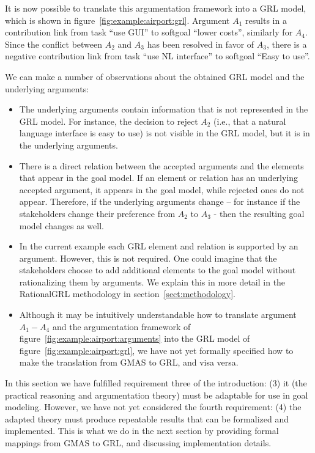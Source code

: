 \documentclass[11.5pt,two column]{llncs}
\begin{document}
It is now possible to translate this argumentation framework into a GRL model, which is shown in figure~\ref{fig:example:airport:grl}. Argument $A_1$ results in a contribution link from task ``use GUI'' to softgoal ``lower costs'', similarly for $A_4$. Since the conflict between $A_2$ and $A_3$ has been resolved in favor of $A_3$, there is a negative contribution link from task ``use NL interface'' to softgoal ``Easy to use''.

We can make a number of observations about the obtained GRL model and the underlying arguments:
\begin{itemize}
\item The underlying arguments contain information that is not represented in the GRL model. For instance, the decision to reject $A_2$ (i.e., that a natural language interface is easy to use) is not visible in the GRL model, but it is in the underlying arguments.
\item There is a direct relation between the accepted arguments and the elements that appear in the goal model. If an element or relation has an underlying accepted argument, it appears in the goal model, while rejected ones do not appear. Therefore, if the underlying arguments change \--- for instance if the stakeholders change their preference from $A_2$ to $A_3$ \-- then the resulting goal model changes as well.
\item In the current example each GRL element and relation is supported by an argument. However, this is not required. One could imagine that the stakeholders choose to add additional elements to the goal model without rationalizing them by arguments. We explain this in more detail in the RationalGRL methodology in section~\ref{sect:methodology}. 
\item Although it may be intuitively understandable how to translate argument $A_1-A_4$ and the argumentation framework of figure~\ref{fig:example:airport:arguments} into the GRL model of figure~\ref{fig:example:airport:grl}, we have not yet formally specified how to make the translation from GMAS to GRL, and visa versa.
\end{itemize}

In this section we have fulfilled requirement three of the introduction: (3) it (the practical reasoning and argumentation theory) must be adaptable for use in goal modeling. However, we have not yet considered the fourth requirement: (4) the adapted theory must produce repeatable results that can be formalized and implemented. This is what we do in the next section by providing formal mappings from GMAS to GRL, and discussing implementation details.
\end{document}
